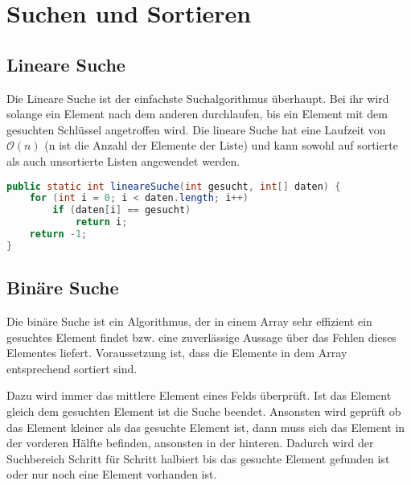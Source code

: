 \chapter{Suchen und Sortieren}
\section{Lineare Suche}
\label{sec:lineareSuche}
Die Lineare Suche ist der einfachste Suchalgorithmus überhaupt.
Bei ihr wird solange ein Element nach dem anderen durchlaufen, bis ein Element mit dem gesuchten Schlüssel angetroffen wird.
Die lineare Suche hat eine Laufzeit von $\mathcal{O}(n)$ (n ist die Anzahl der Elemente der Liste) und kann sowohl auf sortierte als auch unsortierte Listen angewendet werden. 
\begin{lstlisting}[language=java, caption={Beispielimplementierung in Java}]
public static int lineareSuche(int gesucht, int[] daten) {
    for (int i = 0; i < daten.length; i++)
        if (daten[i] == gesucht)
            return i;
    return -1;
}
\end{lstlisting}

\section{Binäre Suche}
\label{sec:binaereSuche}
Die binäre Suche ist ein Algorithmus, der in einem Array sehr effizient ein gesuchtes Element findet bzw. eine zuverlässige Aussage über das Fehlen dieses Elementes liefert.
Voraussetzung ist, dass die Elemente in dem Array entsprechend sortiert sind.

Dazu wird immer das mittlere Element eines Felds überprüft.
Ist das Element gleich dem gesuchten Element ist die Suche beendet.
Ansonsten wird geprüft ob das Element kleiner als das gesuchte Element ist, dann muss sich das Element in der vorderen Hälfte befinden, ansonsten in der hinteren.
Dadurch wird der Suchbereich Schritt für Schritt halbiert bis das gesuchte Element gefunden ist oder nur noch eine Element vorhanden ist.

